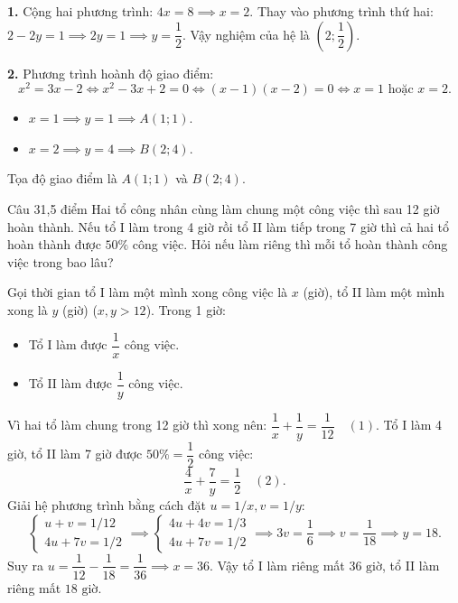 \begin{loi_giai_cau}
\textbf{1.} Cộng hai phương trình: $4x = 8 \implies x = 2$.
Thay vào phương trình thứ hai: $2 - 2y = 1 \implies 2y = 1 \implies y = \dfrac{1}{2}$.
Vậy nghiệm của hệ là $\boxed{\left(2; \dfrac{1}{2}\right)}$.

\textbf{2.} Phương trình hoành độ giao điểm:
\[x^2 = 3x - 2 \iff x^2 - 3x + 2 = 0 \iff (x-1)(x-2) = 0 \iff x = 1\text{ hoặc }x = 2.\]
\begin{itemize}
\item $x = 1 \implies y = 1 \implies A(1; 1)$.
\item $x = 2 \implies y = 4 \implies B(2; 4)$.
\end{itemize}
Tọa độ giao điểm là $\boxed{A(1; 1)}$ và $\boxed{B(2; 4)}$.
\end{loi_giai_cau}

\begin{de_cau}{Câu 3}{1,5 điểm}
Hai tổ công nhân cùng làm chung một công việc thì sau 12 giờ hoàn thành. Nếu tổ I làm trong 4 giờ rồi tổ II làm tiếp trong 7 giờ thì cả hai tổ hoàn thành được $50\%$ công việc. Hỏi nếu làm riêng thì mỗi tổ hoàn thành công việc trong bao lâu?
\end{de_cau}

\begin{loi_giai_cau}
Gọi thời gian tổ I làm một mình xong công việc là $x$ (giờ), tổ II làm một mình xong là $y$ (giờ) ($x, y > 12$).
Trong 1 giờ:
\begin{itemize}
\item Tổ I làm được $\dfrac{1}{x}$ công việc.
\item Tổ II làm được $\dfrac{1}{y}$ công việc.
\end{itemize}
Vì hai tổ làm chung trong 12 giờ thì xong nên: $\dfrac{1}{x} + \dfrac{1}{y} = \dfrac{1}{12} \quad (1)$.
Tổ I làm 4 giờ, tổ II làm 7 giờ được $50\% = \dfrac{1}{2}$ công việc:
\[\frac{4}{x} + \frac{7}{y} = \frac{1}{2} \quad (2).\]
Giải hệ phương trình bằng cách đặt $u = 1/x, v = 1/y$:
\[\begin{cases} u + v = 1/12 \\ 4u + 7v = 1/2 \end{cases} \implies \begin{cases} 4u + 4v = 1/3 \\ 4u + 7v = 1/2 \end{cases} \implies 3v = \frac{1}{6} \implies v = \frac{1}{18} \implies y = 18.\]
Suy ra $u = \dfrac{1}{12} - \dfrac{1}{18} = \dfrac{1}{36} \implies x = 36$.
Vậy tổ I làm riêng mất $\boxed{36\text{ giờ}}$, tổ II làm riêng mất $\boxed{18\text{ giờ}}$.
\end{loi_giai_cau}

